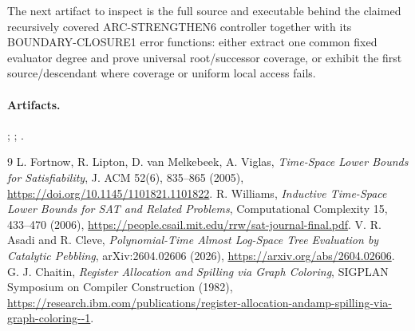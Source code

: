 \documentclass[11pt]{article}
\begin{document}
The next artifact to inspect is the full source and executable behind the
claimed recursively covered ARC-STRENGTHEN6 controller together with its
BOUNDARY-CLOSURE1 error functions: either extract one common fixed evaluator
degree and prove universal root/successor coverage, or exhibit the first
source/descendant where coverage or uniform local access fails.

\paragraph{Artifacts.}
;
;
.

\begin{thebibliography}{9}\small
{} L. Fortnow, R. Lipton, D. van Melkebeek, A. Viglas,
\emph{Time-Space Lower Bounds for Satisfiability}, J. ACM 52(6), 835--865
(2005), \url{https://doi.org/10.1145/1101821.1101822}.
 R. Williams, \emph{Inductive Time-Space Lower Bounds for
SAT and Related Problems}, Computational Complexity 15, 433--470 (2006),
\url{https://people.csail.mit.edu/rrw/sat-journal-final.pdf}.
 V. R. Asadi and R. Cleve,
\emph{Polynomial-Time Almost Log-Space Tree Evaluation by Catalytic Pebbling},
arXiv:2604.02606 (2026), \url{https://arxiv.org/abs/2604.02606}.
 G. J. Chaitin,
\emph{Register Allocation and Spilling via Graph Coloring},
SIGPLAN Symposium on Compiler Construction (1982),
\url{https://research.ibm.com/publications/register-allocation-andamp-spilling-via-graph-coloring--1}.
\end{thebibliography}
\end{document}
